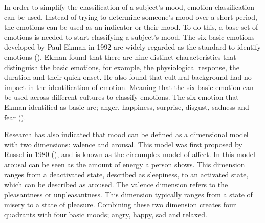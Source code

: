 In order to simplify the classification of a subject's mood, emotion classification can be used. Instead of trying to determine someone's mood over a short period, the emotions can be used as an indicator or their mood. To do this, a base set of emotions is needed to start classifying a subject's mood. The six basic emotions developed by Paul Ekman in 1992 are widely regarded as the standard to identify emotions (\cite{ekman1992argument}). Ekman found that there are nine distinct characteristics that distinguish the basic emotions, for example, the physiological response, the duration and their quick onset. He also found that cultural background had no impact in the identification of emotion. Meaning that the six basic emotion can be used across different cultures to classify emotions. The six emotion that Ekman identified as basic are; anger, happiness, surprise, disgust, sadness and fear (\cite{ekman1992argument}). 

Research has also indicated that mood can be defined as a dimensional model with two dimensions: valence and arousal. This model was first proposed by Russel in 1980 (\cite{russell1980circumplex}), and is known as the circumplex model of affect. In this model arousal can be seen as the amount of energy a person shows. This dimension ranges from a deactivated state, described as sleepiness, to an activated state, which can be described as aroused. The valence dimension refers to the pleasantness or unpleasantness. This dimension typically ranges from a state of misery to a state of pleasure. Combining these two dimension creates four quadrants with four basic moods; angry, happy, sad and relaxed. 